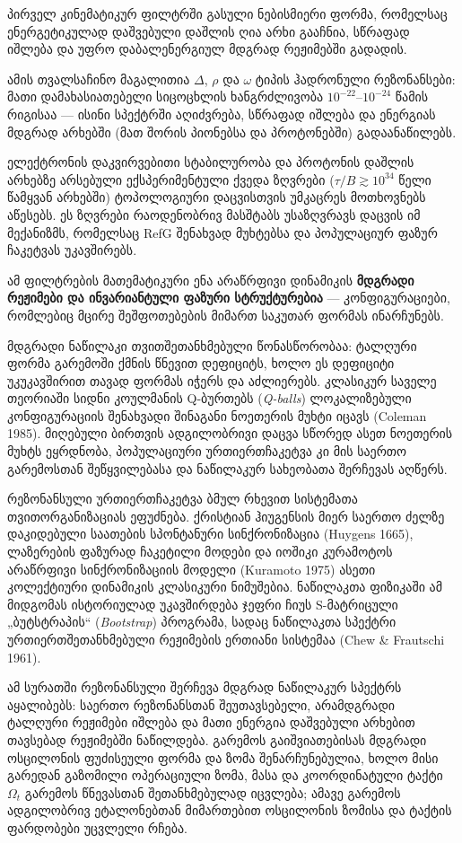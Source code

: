 \documentclass[11pt,a4paper]{article}
\begin{document}
პირველ კინემატიკურ ფილტრში გასული ნებისმიერი ფორმა, რომელსაც ენერგეტიკულად დაშვებული დაშლის ღია არხი გააჩნია, სწრაფად იშლება და უფრო დაბალენერგიულ მდგრად რეჟიმებში გადადის.

ამის თვალსაჩინო მაგალითია $\Delta$, $\rho$ და $\omega$ ტიპის ჰადრონული რეზონანსები: მათი დამახასიათებელი სიცოცხლის ხანგრძლივობა $10^{-22}$–$10^{-24}$ წამის რიგისაა — ისინი სპექტრში აღიძვრება, სწრაფად იშლება და ენერგიას მდგრად არხებში (მათ შორის პიონებსა და პროტონებში) გადაანაწილებს.

ელექტრონის დაკვირვებითი სტაბილურობა და პროტონის დაშლის არხებზე არსებული ექსპერიმენტული ქვედა ზღვრები ($\tau/B\gtrsim10^{34}$ წელი წამყვან არხებში) ტოპოლოგიური დაცვისთვის უმკაცრეს მოთხოვნებს აწესებს. ეს ზღვრები რაოდენობრივ მასშტაბს უსაზღვრავს დაცვის იმ მექანიზმს, რომელსაც RefG შენახვად მუხტებსა და პოპულაციურ ფაზურ ჩაკეტვას უკავშირებს.

ამ ფილტრების მათემატიკური ენა არაწრფივი დინამიკის \textbf{მდგრადი რეჟიმები და ინვარიანტული ფაზური სტრუქტურებია} — კონფიგურაციები, რომლებიც მცირე შეშფოთებების მიმართ საკუთარ ფორმას ინარჩუნებს.

მდგრადი ნაწილაკი თვითშეთანხმებული წონასწორობაა: ტალღური ფორმა გარემოში ქმნის წნევით დეფიციტს, ხოლო ეს დეფიციტი უკუკავშირით თავად ფორმას იჭერს და აძლიერებს. კლასიკურ საველე თეორიაში სიდნი კოულმანის Q-ბურთებს (\emph{Q-balls}) ლოკალიზებული კონფიგურაციის შენახვადი შინაგანი ნოეთერის მუხტი იცავს (Coleman 1985). მიღებული ბირთვის ადგილობრივი დაცვა სწორედ ასეთ ნოეთერის მუხტს ეყრდნობა, პოპულაციური ურთიერთჩაკეტვა კი მის საერთო გარემოსთან შეწყვილებასა და ნაწილაკურ სახეობათა შერჩევას აღწერს.

რეზონანსული ურთიერთჩაკეტვა ბმულ რხევით სისტემათა თვითორგანიზაციას ეფუძნება. ქრისტიან ჰიუგენსის მიერ საერთო ძელზე დაკიდებული საათების სპონტანური სინქრონიზაცია (Huygens 1665), ლაზერების ფაზურად ჩაკეტილი მოდები და იოშიკი კურამოტოს არაწრფივი სინქრონიზაციის მოდელი (Kuramoto 1975) ასეთი კოლექტიური დინამიკის კლასიკური ნიმუშებია. ნაწილაკთა ფიზიკაში ამ მიდგომას ისტორიულად უკავშირდება ჯეფრი ჩიუს S-მატრიცული „ბუტსტრაპის“ (\emph{Bootstrap}) პროგრამა, სადაც ნაწილაკთა სპექტრი ურთიერთშეთანხმებული რეჟიმების ერთიანი სისტემაა (Chew \& Frautschi 1961).

ამ სურათში რეზონანსული შერჩევა მდგრად ნაწილაკურ სპექტრს აყალიბებს: საერთო რეზონანსთან შეუთავსებელი, არამდგრადი ტალღური რეჟიმები იშლება და მათი ენერგია დაშვებული არხებით თავსებად რეჟიმებში ნაწილდება. გარემოს გაიშვიათებისას მდგრადი ოსცილონის ფუძისეული ფორმა და ზომა შენარჩუნებულია, ხოლო მისი გარედან გაზომილი ოპერაციული ზომა, მასა და კოორდინატული ტაქტი $\Omega_t$ გარემოს წნევასთან შეთანხმებულად იცვლება; ამავე გარემოს ადგილობრივ ეტალონებთან მიმართებით ოსცილონის ზომისა და ტაქტის ფარდობები უცვლელი რჩება.
\end{document}
